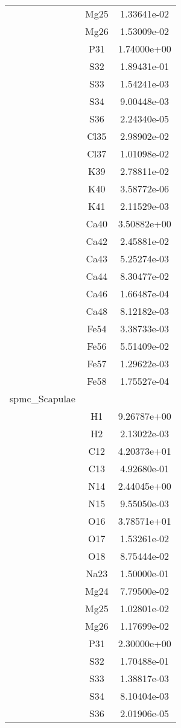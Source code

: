 \begin{centering}
\begin{longtable}{l c c}
& Mg25 & 1.33641e-02 \\ 
& Mg26 & 1.53009e-02 \\ 
& P31 & 1.74000e+00 \\ 
& S32 & 1.89431e-01 \\ 
& S33 & 1.54241e-03 \\ 
& S34 & 9.00448e-03 \\ 
& S36 & 2.24340e-05 \\ 
& Cl35 & 2.98902e-02 \\ 
& Cl37 & 1.01098e-02 \\ 
& K39 & 2.78811e-02 \\ 
& K40 & 3.58772e-06 \\ 
& K41 & 2.11529e-03 \\ 
& Ca40 & 3.50882e+00 \\ 
& Ca42 & 2.45881e-02 \\ 
& Ca43 & 5.25274e-03 \\ 
& Ca44 & 8.30477e-02 \\ 
& Ca46 & 1.66487e-04 \\ 
& Ca48 & 8.12182e-03 \\ 
& Fe54 & 3.38733e-03 \\ 
& Fe56 & 5.51409e-02 \\ 
& Fe57 & 1.29622e-03 \\ 
& Fe58 & 1.75527e-04 \\ 
\hline
spmc_Scapulae & & \\
\hline
& H1 & 9.26787e+00 \\ 
& H2 & 2.13022e-03 \\ 
& C12 & 4.20373e+01 \\ 
& C13 & 4.92680e-01 \\ 
& N14 & 2.44045e+00 \\ 
& N15 & 9.55050e-03 \\ 
& O16 & 3.78571e+01 \\ 
& O17 & 1.53261e-02 \\ 
& O18 & 8.75444e-02 \\ 
& Na23 & 1.50000e-01 \\ 
& Mg24 & 7.79500e-02 \\ 
& Mg25 & 1.02801e-02 \\ 
& Mg26 & 1.17699e-02 \\ 
& P31 & 2.30000e+00 \\ 
& S32 & 1.70488e-01 \\ 
& S33 & 1.38817e-03 \\ 
& S34 & 8.10404e-03 \\ 
& S36 & 2.01906e-05 \\ 

\end{longtable}
\end{centering}
